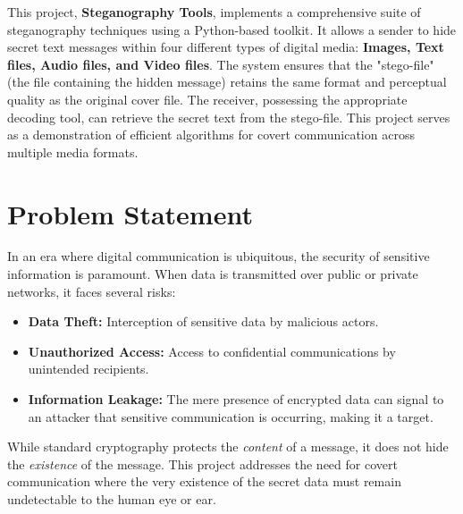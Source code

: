 \documentclass[12pt,a4paper]{report}
\begin{document}
This project, \textbf{Steganography Tools}, implements a comprehensive suite of steganography techniques using a Python-based toolkit. It allows a sender to hide secret text messages within four different types of digital media: \textbf{Images, Text files, Audio files, and Video files}. The system ensures that the "stego-file" (the file containing the hidden message) retains the same format and perceptual quality as the original cover file. The receiver, possessing the appropriate decoding tool, can retrieve the secret text from the stego-file. This project serves as a demonstration of efficient algorithms for covert communication across multiple media formats.

\chapter{Problem Statement}
In an era where digital communication is ubiquitous, the security of sensitive information is paramount. When data is transmitted over public or private networks, it faces several risks:
\begin{itemize}
    \item \textbf{Data Theft:} Interception of sensitive data by malicious actors.
    \item \textbf{Unauthorized Access:} Access to confidential communications by unintended recipients.
    \item \textbf{Information Leakage:} The mere presence of encrypted data can signal to an attacker that sensitive communication is occurring, making it a target.
\end{itemize}

While standard cryptography protects the \textit{content} of a message, it does not hide the \textit{existence} of the message. This project addresses the need for covert communication where the very existence of the secret data must remain undetectable to the human eye or ear.

\end{document}
